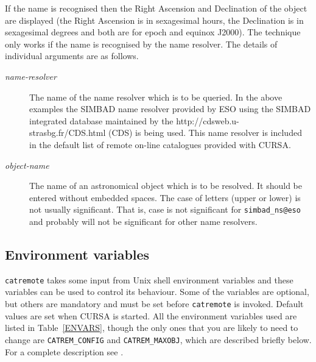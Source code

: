 \documentclass[twoside,11pt]{starlink}
\begin{document}
If the name is recognised then the Right Ascension and Declination of the
object are displayed (the Right Ascension is in sexagesimal hours, the
Declination is in sexagesimal degrees and both are for epoch and equinox
J2000).  The technique only works if the name is recognised by the name
resolver.  The details of individual arguments are as follows.

\begin{description}

  \item[\textit{name-resolver}\/] The name of the name resolver which is to
   be queried.  In the above examples the SIMBAD name resolver provided by
   ESO using the SIMBAD integrated database maintained by the
   {http://cdsweb.u-strasbg.fr/CDS.html} (CDS) is being used.  This name
   resolver is included in the default list of remote on-line catalogues
   provided with CURSA.

  \item[\textit{object-name}] The name of an astronomical object which is to
   be resolved.  It should be entered without embedded spaces.  The case of
   letters (upper or lower) is not usually significant.  That is, case is
   not significant for \texttt{simbad\_ns@eso} and probably will not be
   significant for other name resolvers.

\end{description}

\subsection{Environment variables}

\texttt{catremote} takes some input from Unix shell environment variables
and these variables can be used to control its behaviour.  Some of the
variables are optional, but others are mandatory and must be set before
\texttt{catremote} is invoked.  Default values are set when CURSA is started.
All the environment variables used are listed in Table~\ref{ENVARS}, though
the only ones that you are likely to need to change are \texttt{CATREM\_CONFIG}
and \texttt{CATREM\_MAXOBJ}, which are described briefly below.  For a
complete description see \cite{SSN76}.
\end{document}
